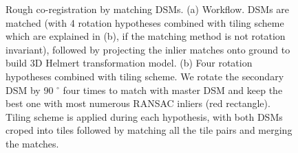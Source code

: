 \begin{figure}[htbp]
    \begin{center}
        \caption{Rough co-registration by matching DSMs. (a) Workflow. DSMs are matched (with 4 rotation hypotheses combined with tiling scheme which are explained in (b), if the matching method is not rotation invariant), followed by projecting the inlier matches onto ground to build 3D Helmert transformation model. (b) Four rotation hypotheses combined with tiling scheme. We rotate the secondary DSM by 90 $^\circ$ four times to match with master DSM and keep the best one with most numerous RANSAC inliers (red rectangle). Tiling scheme is applied during each hypothesis, with both DSMs croped into tiles followed by matching all the tile pairs and merging the matches.}
        \label{WorkflowDSM}
    \end{center}
\end{figure}


